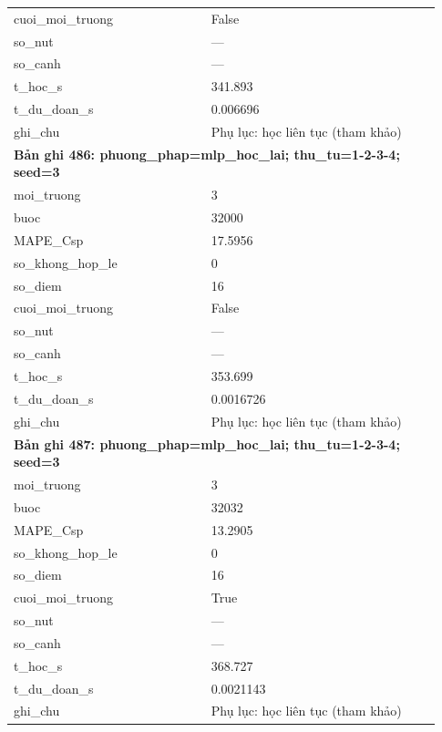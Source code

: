 \begin{longtable}{p{0.43\linewidth}p{0.50\linewidth}}
cuoi\_\allowbreak moi\_\allowbreak truong & False \\
so\_\allowbreak nut & — \\
so\_\allowbreak canh & — \\
t\_\allowbreak hoc\_\allowbreak s & 341.893 \\
t\_\allowbreak du\_\allowbreak doan\_\allowbreak s & 0.006696 \\
ghi\_\allowbreak chu & Phụ lục: học liên tục (tham khảo) \\
\midrule
\multicolumn{2}{p{0.95\linewidth}}{\textbf{Bản ghi 486: phuong\_phap=mlp\_hoc\_lai; thu\_tu=1-2-3-4; seed=3}} \\
moi\_\allowbreak truong & 3 \\
buoc & 32000 \\
MAPE\_\allowbreak Csp & 17.5956 \\
so\_\allowbreak khong\_\allowbreak hop\_\allowbreak le & 0 \\
so\_\allowbreak diem & 16 \\
cuoi\_\allowbreak moi\_\allowbreak truong & False \\
so\_\allowbreak nut & — \\
so\_\allowbreak canh & — \\
t\_\allowbreak hoc\_\allowbreak s & 353.699 \\
t\_\allowbreak du\_\allowbreak doan\_\allowbreak s & 0.0016726 \\
ghi\_\allowbreak chu & Phụ lục: học liên tục (tham khảo) \\
\midrule
\multicolumn{2}{p{0.95\linewidth}}{\textbf{Bản ghi 487: phuong\_phap=mlp\_hoc\_lai; thu\_tu=1-2-3-4; seed=3}} \\
moi\_\allowbreak truong & 3 \\
buoc & 32032 \\
MAPE\_\allowbreak Csp & 13.2905 \\
so\_\allowbreak khong\_\allowbreak hop\_\allowbreak le & 0 \\
so\_\allowbreak diem & 16 \\
cuoi\_\allowbreak moi\_\allowbreak truong & True \\
so\_\allowbreak nut & — \\
so\_\allowbreak canh & — \\
t\_\allowbreak hoc\_\allowbreak s & 368.727 \\
t\_\allowbreak du\_\allowbreak doan\_\allowbreak s & 0.0021143 \\
ghi\_\allowbreak chu & Phụ lục: học liên tục (tham khảo) \\

\end{longtable}
